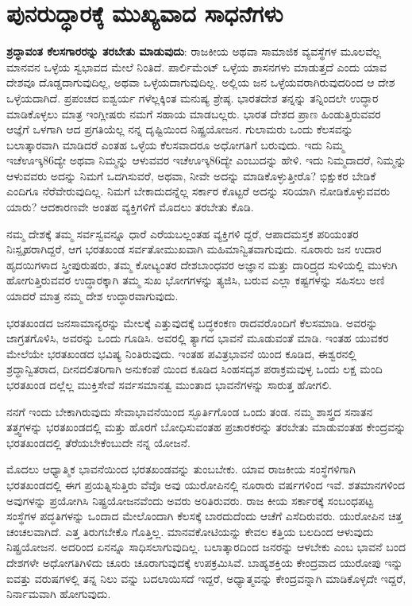 
\chapter{ಪುನರುದ್ಧಾರಕ್ಕೆ ಮುಖ್ಯವಾದ ಸಾಧನೆಗಳು}

\textbf{ಶ್ರದ್ಧಾವಂತ ಕೆಲಸಗಾರರನ್ನು ತರಬೇತು ಮಾಡುವುದು}: ರಾಜಕೀಯ ಅಥವಾ ಸಾಮಾಜಿಕ ವ್ಯವಸ್ಥೆಗಳ ಮೂಲವೆಲ್ಲ ಮಾನವನ ಒಳ್ಳೆಯ ಸ್ವಭಾವದ ಮೇಲೆ ನಿಂತಿದೆ. ಪಾರ್ಲಿಮೆಂಟ್ ಒಳ್ಳೆಯ ಶಾಸನಗಳು ಮಾಡುತ್ತದೆ ಎಂದು ಯಾವ ದೇಶವೂ ದೊಡ್ಡದಾಗುವುದಿಲ್ಲ, ಅಥವಾ ಒಳ್ಳೆಯದಾಗುವುದಿಲ್ಲ. ಅಲ್ಲಿಯ ಜನ ಒಳ್ಳೆಯವರಾಗಿರುವುದರಿಂದ ಆ ದೇಶ ಒಳ್ಳೆಯದಾಗಿದೆ. ಪ್ರಪಂಚದ ಐಶ್ವರ್ಯ ಗಳೆಲ್ಲಕ್ಕಿಂತ ಮನುಷ್ಯ ಶ್ರೇಷ್ಠ. ಭಾರತದೇಶ ತನ್ನನ್ನು ತನ್ನಿಂದಲೇ ಉದ್ಧಾರ ಮಾಡಿಕೊಳ್ಳಲು ಮಾತ್ರ ಇಂಗ್ಲೀಷರು ನಮಗೆ ಸಹಾಯ ಮಾಡಬಲ್ಲರು. ಭಾರತ ದೇಶದ ಪ್ರಾಣ ಹಿಂಡುತ್ತಿರುವವರ ಆಜ್ಞೆಗೆ ಒಳಗಾಗಿ ಆದ ಪ್ರಗತಿಯೆಲ್ಲ ನನ್ನ ದೃಷ್ಟಿಯಿಂದ ನಿಷ್ಪ್ರಯೋಜನ. ಗುಲಾಮರು ಒಂದು ಕೆಲಸವನ್ನು ಬಲಾತ್ಕಾರವಾಗಿ ಮಾಡಿದರೆ ಎಂತಹ ಒಳ್ಳೆಯ ಕೆಲಸವಾದರೂ ಅಧೋಗತಿಗೆ ಬರುವುದು. ಇದು ನಿಮ್ಮ ಇಚೆಊಇ್ಕ86ದ್ಯೇ ಅಥವಾ ನಿಮ್ಮನ್ನು ಆಳುವವರ ಇಚೆಊಇ್ಕ86ದ್ಯೇ ಎಂಬುದನ್ನು ಹೇಳಿ. ಇದು ನಿಮ್ಮದಾದರೆ, ನಿಮ್ಮನ್ನು ಆಳುವವರು ಅದನ್ನು ನಿಮಗೆ ಒದಗಿಸುವರೆ, ಅಥವಾ, ನೀವೇ ಅದನ್ನು ಮಾಡಿಕೊಳ್ಳುತ್ತೀರೊ? ಭಿಕ್ಷುಕರ ಬೇಡಿಕೆ ಎಂದಿಗೂ ನೆರೆವೇರುವುದಿಲ್ಲ. ನಿಮಗೆ ಬೇಕಾದುದನ್ನೆಲ್ಲ ಸರ್ಕಾರ ಕೊಟ್ಟರೆ ಅದನ್ನು ಸರಿಯಾಗಿ ನೋಡಿಕೊಳ್ಳುವವರು ಯಾರು? ಆದಕಾರಣವೇ ಅಂತಹ ವ್ಯಕ್ತಿಗಳಿಗೆ ಮೊದಲು ತರಬೇತು ಕೊಡಿ.

ನಮ್ಮ ದೇಶಕ್ಕೆ ತಮ್ಮ ಸರ್ವಸ್ವವನ್ನೂ ಧಾರೆ ಎರೆಯಬಲ್ಲಂತಹ ವ್ಯಕ್ತಿಗಳಿ ದ್ದರೆ, ಆಪಾದಮಸ್ತಕ ಪರಿಯಂತರ ನಿಃಸ್ಪೃಹರಾಗಿದ್ದರೆ, ಆಗ ಭರತಖಂಡ ಸರ್ವತೋಮುಖವಾಗಿ ಮಹಿಮಾನ್ವಿತವಾಗುವುದು. ನೂರಾರು ಜನ ಉದಾರ ಹೃದಯಿಗಳಾದ ಸ್ತ್ರೀಪುರುಷರು, ತಮ್ಮ ಕೋಟ್ಯಂತರ ದೇಶಬಾಂಧವರ ಅಜ್ಞಾನ ಮತ್ತು ದಾರಿದ್ರ್ಯದ ಸುಳಿಯಲ್ಲಿ ಮುಳುಗಿ ಹೋಗುತ್ತಿರುವವರ ಉದ್ಧಾರಕ್ಕಾಗಿ ತಮ್ಮ ಸುಖ ಭೋಗಗಳನ್ನು ತ್ಯಜಿಸಿ, ಬರುವ ಎಲ್ಲಾ ಕಷ್ಟಗಳನ್ನು ಸಹಿಸಲು ಅಣಿ ಯಾದರೆ ಮಾತ್ರ ನಮ್ಮ ದೇಶ ಉದ್ಧಾರವಾಗುವುದು.

ಭರತಖಂಡದ ಜನಸಾಮಾನ್ಯರನ್ನು ಮೇಲಕ್ಕೆ ಎತ್ತುವುದಕ್ಕೆ ಬದ್ಧಕಂಕಣ ರಾದವರೊಂದಿಗೆ ಕೆಲಸಮಾಡಿ. ಅವರನ್ನು ಜಾಗ್ರತಗೊಳಿಸಿ, ಅವರನ್ನು ಒಂದು ಗೂಡಿಸಿ. ಅವರಲ್ಲಿ ತ್ಯಾಗದ ಭಾವನೆ ಮೂಡುವಂತೆ ಮಾಡಿ. ಇಂತಹ ಯುವಕರ ಮೇಲೆಯೇ ಭರತಖಂಡದ ಭವಿಷ್ಯ ನಿಂತಿರುವುದು. ಇಂತಹ ಪವಿತ್ರಭಾವನೆ ಯಿಂದ ಕೂಡಿದ, ಈಶ್ವರನಲ್ಲಿ ಶ್ರದ್ಧಾನ್ವಿತರಾದ, ದೀನದಲಿತರಿಗಾಗಿ ಅನುಕಂಪೆ ಯಿಂದ ಕೂಡಿದ ಸಿಂಹಸದೃಶ ಪರಾಕ್ರಮವುಳ್ಳ ಒಂದು ಲಕ್ಷ ಮಂದಿ ಭರತಖಂಡ ದಲ್ಲೆಲ್ಲ ಮುಕ್ತಿಸೇವೆ ಸರ್ವಸಮಾನತ್ವ ಮುಂತಾದ ಭಾವನೆಗಳನ್ನು ಸಾರುತ್ತ ಹೋಗಲಿ.

ನನಗೆ ಇಂದು ಬೇಕಾಗಿರುವುದು ಸೇವಾಭಾವನೆಯಿಂದ ಸ್ಫೂರ್ತಿಗೊಂಡ ಒಂದು ತಂಡ. ನಮ್ಮ ಶಾಸ್ತ್ರದ ಸನಾತನ ತತ್ತ್ವಗಳನ್ನು ಭರತಖಂಡದಲ್ಲಿ ಮತ್ತು ಹೊರಗೆ ಬೋಧಿಸುವಂತಹ ಪ್ರಚಾರಕರನ್ನು ತರಬೇತು ಮಾಡುವಂತಹ ಕೇಂದ್ರವನ್ನು ಭರತಖಂಡದಲ್ಲಿ ತೆರೆಯಬೇಕೆಂಬುದೇ ನನ್ನ ಯೋಜನೆ.

ಮೊದಲು ಆಧ್ಯಾತ್ಮಿಕ ಭಾವನೆಯಿಂದ ಭರತಖಂಡವನ್ನು ತುಂಬಬೇಕು. ಯಾವ ರಾಜಕೀಯ ಸಂಸ್ಥೆಗಳಿಗಾಗಿ ಭರತಖಂಡದಲ್ಲಿ ಈಗ ಪ್ರಯತ್ನಿಸುತ್ತಿರು ವೆವೊ ಅವು ಯುರೋಪಿನಲ್ಲಿ ನೂರಾರು ವರ್ಷಗಳಿಂದ ಇವೆ. ಶತಮಾನಗಳಿಂದ ಅವುಗಳನ್ನು ಪ್ರಯೋಗಿಸಿ ನಿಷ್ಪ್ರಯೋಜನವೆಂದು ಅವರು ಅರಿತಿರುವರು. ರಾಜ ಕೀಯ ಸರ್ಕಾರಕ್ಕೆ ಸಂಬಂಧಪಟ್ಟ ಸಂಸ್ಥೆಗಳ ಪದ್ಧತಿಗಳನ್ನು ಒಂದಾದ ಮೇಲೊಂದಾಗಿ ಕೆಲಸಕ್ಕೆ ಬಾರದುದೆಂದು ಆಚೆಗೆ ಎಸೆದಿರುವರು. ಯುರೋಪಿನ ಚಿತ್ತ ಚಂಚಲವಾಗಿದೆ. ಎತ್ತ ತಿರುಗಬೇಕೊ ಗೊತ್ತಿಲ್ಲ. ಮಾನವಕೋಟಿಯನ್ನು ಕೇವಲ ಕತ್ತಿಯ ಬಲದಿಂದ ಆಳುವುದು ನಿಷ್ಪ್ರಯೋಜನ. ಅದರಿಂದ ಏನನ್ನೂ ಸಾಧಿಸಲಾಗುವುದಿಲ್ಲ. ಬಲಾತ್ಕಾರದಿಂದ ಜನರನ್ನು ಆಳಬೇಕು ಎಂಬ ಭಾವನೆ ಬಂದ ದೇಶಗಳೇ ಅಧೋಗತಿಗಿಳಿದು ಚೂರು ಚೂರಾಗುವುದಕ್ಕೆ ಉಪಕ್ರಮಿಸಿವೆ. ಬಾಹ್ಯಶಕ್ತಿಯ ಕೇಂದ್ರವಾದ ಯುರೋಪು ಇನ್ನು ಐವತ್ತು ವರುಷಗಳಲ್ಲಿ ತನ್ನ ನಿಲು ವನ್ನು ಬದಲಾಯಿಸದೆ ಇದ್ದರೆ, ಅಧ್ಯಾತ್ಮವನ್ನು ಕೇಂದ್ರವನ್ನಾಗಿ ಮಾಡಿಕೊಳ್ಳದೇ ಇದ್ದರೆ, ನಿರ್ನಾಮವಾಗಿ ಹೋಗುವುದು.


